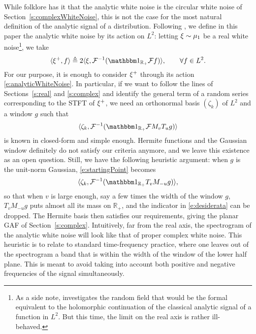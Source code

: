 While folklore has it that the analytic white noise is the circular white noise of Section~\ref{s:complexWhiteNoise}, this is not the case for the most natural
  definition of the analytic signal of a distribution. Following
  \citep[Section 3.3]{Pug82}, we define in this paper the analytic white noise by its action on $L^2$: letting $\xi\sim\mu_1$ be a real white noise\footnote{As a side
    note, \cite[Section 3]{Pug82} investigates the random field that would be the formal equivalent to the holomorphic continuation of the classical analytic
signal of a function in $L^2$. But this time, the limit on the real axis is
rather ill-behaved.}, we take
\begin{equation}
\langle \fomega^+,f \rangle \triangleq 2 \langle \fomega,
\cF^{-1}(\IND_{\mathbb{R}_+}\cF f)\rangle, \qquad\forall f\in L^2.
\label{e:analyticWhiteNoise}
\end{equation}
For our purpose, it is enough to consider $\xi^+$
through its action \eqref{e:analyticWhiteNoise}. In particular, if we want to
follow the lines of Sections~\ref{s:real} and \ref{s:complex} and identify the general term of
a random series corresponding to the STFT of
$\xi^+$, we need an orthonormal basis $(\zeta_k)$ of $L^2$ and a window $g$ such that 
\begin{equation}
\langle \zeta_k, \cF^{-1}(\IND_{\mathbb{R}_+}\cF M_vT_u g)\rangle 
\label{e:startingPoint}
\end{equation}
is known in closed-form and simple enough. Hermite functions and the Gaussian
window definitely do not satisfy our criteria anymore, and we leave this existence as an
open question. Still, we have the following heuristic argument: when $g$ is the
unit-norm Gaussian, \eqref{e:startingPoint} becomes
\begin{equation}
\langle \zeta_k, \cF^{-1}(\IND_{\mathbb{R}_+}T_vM_{-u} g)\rangle,
\label{e:desiderata}
\end{equation}
so that when $v$ is
large enough, say a few times the width of the window $g$, $T_v M_{-u} g$ puts
almost all its mass on $\mathbb{R}_+$, and the indicator in
\eqref{e:desiderata} can be dropped. The Hermite basis then satisfies our
requirements, giving the planar GAF of Section~\ref{s:complex}. Intuitively, far
from the real axis, the spectrogram of the analytic white noise will look
like that of proper complex white noise. This heuristic is to relate to standard
time-frequency practice, where one leaves out of the spectrogram a band that is
within the width of the window of the lower half plane. This is meant to avoid
taking into account both positive and negative frequencies of the signal
simultaneously.

